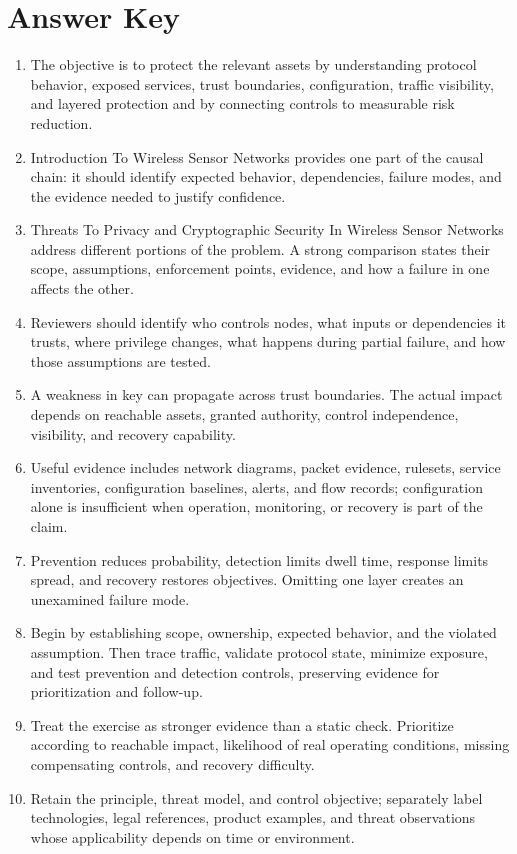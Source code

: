 \documentclass[11pt]{article}
\begin{document}
\section*{Answer Key}
\begin{enumerate}
\item The objective is to protect the relevant assets by understanding protocol behavior, exposed services, trust boundaries, configuration, traffic visibility, and layered protection and by connecting controls to measurable risk reduction.
\item Introduction To Wireless Sensor Networks provides one part of the causal chain: it should identify expected behavior, dependencies, failure modes, and the evidence needed to justify confidence.
\item Threats To Privacy and Cryptographic Security In Wireless Sensor Networks address different portions of the problem. A strong comparison states their scope, assumptions, enforcement points, evidence, and how a failure in one affects the other.
\item Reviewers should identify who controls nodes, what inputs or dependencies it trusts, where privilege changes, what happens during partial failure, and how those assumptions are tested.
\item A weakness in key can propagate across trust boundaries. The actual impact depends on reachable assets, granted authority, control independence, visibility, and recovery capability.
\item Useful evidence includes network diagrams, packet evidence, rulesets, service inventories, configuration baselines, alerts, and flow records; configuration alone is insufficient when operation, monitoring, or recovery is part of the claim.
\item Prevention reduces probability, detection limits dwell time, response limits spread, and recovery restores objectives. Omitting one layer creates an unexamined failure mode.
\item Begin by establishing scope, ownership, expected behavior, and the violated assumption. Then trace traffic, validate protocol state, minimize exposure, and test prevention and detection controls, preserving evidence for prioritization and follow-up.
\item Treat the exercise as stronger evidence than a static check. Prioritize according to reachable impact, likelihood of real operating conditions, missing compensating controls, and recovery difficulty.
\item Retain the principle, threat model, and control objective; separately label technologies, legal references, product examples, and threat observations whose applicability depends on time or environment.
\end{enumerate}
\end{document}
